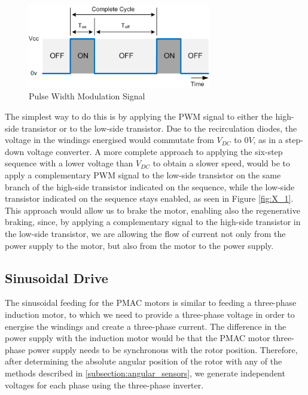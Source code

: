 \begin{figure}[htbp]
\centering
\includegraphics[width=8cm]{Images/dutycycle.png} 
\caption[PWM Signal]{Pulse Width Modulation Signal}
\label{fig:dutycycle}
\end{figure}

The simplest way to do this is by applying the \ac{PWM} signal to either the high-side transistor or to the low-side transistor. Due to the recirculation diodes, the voltage in the windings energised would commutate from $V_{DC}$ to $0V$, as in a step-down voltage converter. A more complete approach to applying the six-step sequence with a lower voltage than $V_{DC}$ to obtain a slower speed, would be to apply a complementary PWM signal to the low-side transistor on the same branch of the high-side transistor indicated on the sequence, while the low-side transistor indicated on the sequence stays enabled, as seen in Figure \ref{fig:X_1}. This approach would allow us to brake the motor, enabling also the regenerative braking, since, by applying a complementary signal to the high-side transistor in the low-side transistor, we are allowing the flow of current not only from the power supply to the motor, but also from the motor to the power supply.

\subsection{Sinusoidal Drive}\label{subsection:sinusoidal_drive}

The sinusoidal feeding for the \ac{PMAC} motors is similar to feeding a three-phase induction motor, to which we need to provide a three-phase voltage in order to energise the windings and create a three-phase current. The difference in the power supply with the induction motor would be that the \ac{PMAC} motor three-phase power supply needs to be synchronous with the rotor position. Therefore, after determining the absolute angular position of the rotor with any of the methods described in \ref{subsection:angular_sensors}, we generate independent voltages for each phase using the three-phase inverter.

